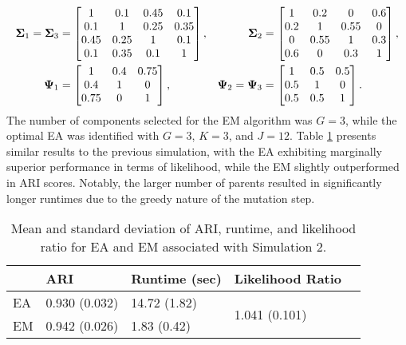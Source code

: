 \documentclass[12pt, centerh1]{article}
\begin{document}
\begin{align*}
{\bf \Sigma}_1 = {\bf \Sigma}_3 &=
\begin{bmatrix} 
1 &     0.1&     0.45&        0.1\\
                0.1&     1&     0.25&    0.35\\
                0.45&       0.25&     1&     0.1\\
                0.1&      0.35&       0.1&       1\\
\end{bmatrix},&  
{\bf \Sigma}_2 &=
\begin{bmatrix} 
      1  &      0.2 &     0  & 0.6 \\
      0.2 &       1 &       0.55      & 0\\
      0 &        0.55  &   1      & 0.3\\
   0.6 &       0  &             0.3     & 1
\end{bmatrix},
\\
{\bf \Psi}_1 &=
\begin{bmatrix} 
1  &  0.4 & 0.75   \\
0.4 & 1 &  0\\
 0.75 & 0  & 1 
\end{bmatrix},  &
{\bf \Psi}_2= {\bf \Psi}_3 &= 
\begin{bmatrix} 
1  &  0.5 & 0.5   \\
0.5 & 1 &  0\\
 0.5 & 0.5  & 1 
\end{bmatrix}.
\end{align*}
The number of components selected for the EM algorithm was $G=3$, while the optimal EA was identified with $G=3$, $K=3$, and $J=12$. Table \ref{table:sim2} presents similar results to the previous simulation, with the EA exhibiting marginally superior performance in terms of likelihood, while the EM slightly outperformed in ARI scores. Notably, the larger number of parents resulted in significantly longer runtimes due to the greedy nature of the mutation step.

\begin{table}[!ht]
  \caption{Mean and standard deviation of ARI, runtime, and likelihood ratio for EA and EM associated with Simulation 2.}
      \label{table:sim2}
  \begin{tabularx}{\textwidth}{l *{3}{X}c}
  \toprule
    &\textbf{ARI}& \textbf{Runtime (sec)}  & \textbf{Likelihood Ratio} \\
  \midrule
  EA & 0.930 (0.032)     & 14.72 (1.82) & \multirow{2}{*}{1.041 (0.101)}  \\
  EM & 0.942 (0.026)    & 1.83 (0.42)   \\
  \bottomrule
  \end{tabularx}
\end{table}
\end{document}
